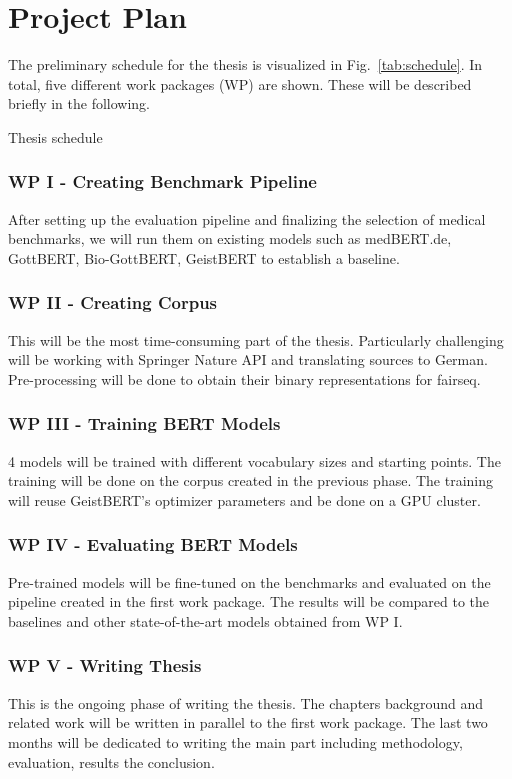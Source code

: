 \chapter*{Project Plan}\label{chapter:schedule}

The preliminary schedule for the thesis is visualized in
Fig.~\ref{tab:schedule}. In total, five different work packages (WP) are shown.
These will be described briefly in the following.

\begin{table}[h]
    \centering
     
    \caption{Thesis schedule}
    \label{tab:schedule}
\end{table}

\subsection*{WP I - Creating Benchmark Pipeline}
After setting up the evaluation pipeline and finalizing the selection of medical
benchmarks, we will run them on existing models such as medBERT.de, GottBERT,
Bio-GottBERT, GeistBERT to establish a baseline.

\subsection*{WP II - Creating Corpus}
This will be the most time-consuming part of the thesis. Particularly
challenging will be working with Springer Nature API and translating sources to
German. Pre-processing will be done to obtain their binary representations for
fairseq.

\subsection*{WP III - Training BERT Models}
4 models will be trained with different vocabulary sizes and starting points.
The training will be done on the corpus created in the previous phase. The
training will reuse GeistBERT's optimizer parameters and be done on a GPU
cluster. 

\subsection*{WP IV - Evaluating BERT Models}
Pre-trained models will be fine-tuned on the benchmarks and evaluated on the
pipeline created in the first work package. The results will be compared to the
baselines and other state-of-the-art models obtained from WP I.

\subsection*{WP V - Writing Thesis}
This is the ongoing phase of writing the thesis. The chapters background and
related work  will be written in parallel to the first work package. The last
two months will be dedicated to writing the main part including methodology,
evaluation, results the conclusion.

